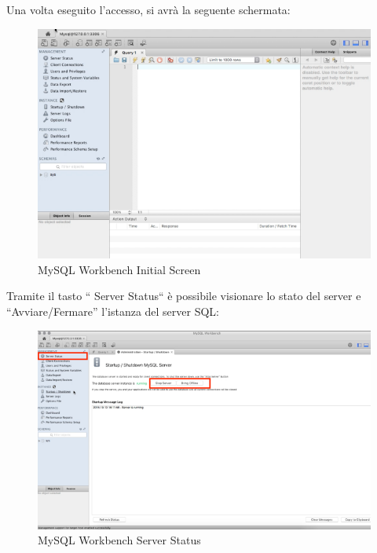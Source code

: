 Una volta eseguito l’accesso, si avrà la seguente schermata: 

\begin{center}
\begin{figure}[H]
\centering
\includegraphics[scale=0.8]{figures/mySQL_workbench_initial.png}
\caption{MySQL Workbench Initial Screen}
\end{figure}
\end{center}

Tramite il tasto “ Server Status“ è possibile visionare lo stato del server e “Avviare/Fermare” l’istanza del server SQL:

\begin{center}
\begin{figure}[H]
\centering
\includegraphics[scale=0.8]{figures/mySQL_workbench_serverstatus.png}
\caption{MySQL Workbench Server Status}
\end{figure}
\end{center}

